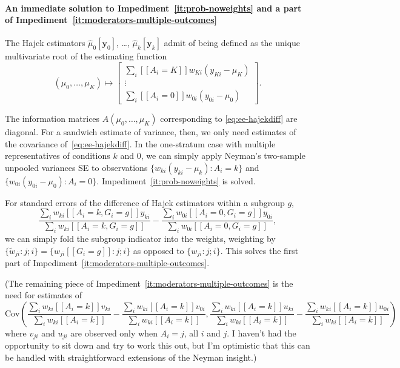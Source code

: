 \paragraph*{An immediate solution to
  Impediment~\ref{it:prob-noweights} and a part of Impediment~\ref{it:moderators-multiple-outcomes}}

The Hajek estimators $\hat{\mu}_{0}[\mathbf{y}_{0}]$, \ldots,
$\hat{\mu}_{k}[\mathbf{y}_{k}]$ admit of being defined as the unique
multivariate root of the estimating function
\begin{equation} \label{eq:ee-hajekdiff}
(\mu_{0}, \ldots, \mu_{K}) \mapsto
  \left[
\begin{array}{c}
\sum_i [\![A_i=K]\!] w_{Ki} (y_{Ki} - \mu_K) \\
\vdots \\
\sum_i [\![A_i=0]\!] w_{0i} (y_{0i} - \mu_0) 
\end{array}
\right]
.
\end{equation}

The information matrices $A(\mu_0, \ldots, \mu_K)$ corresponding to
\eqref{eq:ee-hajekdiff} are diagonal.  For a sandwich estimate of
variance, then, we only need estimates of the covariance
of~\eqref{eq:ee-hajekdiff}.  In the one-stratum case with multiple
representatives of conditions $k$ and $0$, we can simply apply
Neyman's two-sample unpooled variances SE to observations $\{ w_{ki}
(y_{ki} - \mu_k) : A_i = k\}$ and $\{ w_{0i} (y_{0i} - \mu_0) : A_i =
0\}$.  Impediment~\ref{it:prob-noweights} is solved. 

For standard errors of the difference of Hajek estimators within a
subgroup $g$,
\begin{equation*}
 \frac{\sum_i w_{ki} [\![A_i=k, G_{i} =g]\!] y_{ki}}{\sum_i w_{ki}
     [\![A_i=k, G_{i}=g]\!]}
 -
  \frac{\sum_i w_{0i} [\![A_i=0, G_{i} =g]\!] y_{0i}}{\sum_i w_{0i}
     [\![A_i=0, G_{i}=g]\!]},
\end{equation*}
we can simply fold the subgroup indicator into the weights,
weighting by $\{\tilde{w}_{ji}:j; i\} = \{w_{ji}[\![G_{i}=g]\!]: j; i\}$ as opposed to $\{w_{ji}:j;
i\}$. This solves the first part of
Impediment~\ref{it:moderators-multiple-outcomes}.

(The remaining piece of Impediment~\ref{it:moderators-multiple-outcomes}
is the need for estimates of
\begin{equation*}
  \mathrm{Cov}\left(
    \frac{\sum_i w_{ki} [\![A_i=k]\!] v_{ki}}{\sum_i w_{ki}
      [\![A_i=k]\!]} -
    \frac{\sum_i w_{ki} [\![A_i=k]\!] v_{0i}}{\sum_i w_{ki}  [\![A_i=k]\!]},
  \frac{\sum_i {w}_{ki} [\![A_i=k]\!] u_{ki}}{\sum_i {w}_{ki}
      [\![A_i=k]\!]} -
    \frac{\sum_i {w}_{ki} [\![A_i=k]\!] u_{0i}}{\sum_i {w}_{ki}  [\![A_i=k]\!]}
  \right)
\end{equation*}
where $v_{ji}$ and $u_{ji}$ are observed only
when $A_{i}=j$, all $i$ and $j$.   I haven't had the opportunity to
sit down and try to work this out, but I'm optimistic that this
can be handled with straightforward extensions of the Neyman insight.)

